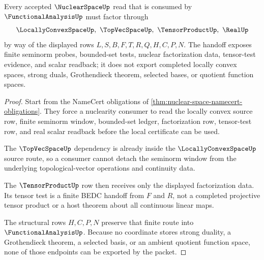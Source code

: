 \begin{theorem}
\label{thm:nuclear-space-finite-tensor-test-handoff}
Every accepted $\NuclearSpaceUp$ read that is consumed by $\FunctionalAnalysisUp$ must factor through
$$
\LocallyConvexSpaceUp,\ \TopVecSpaceUp,\ \TensorProductUp,\ \RealUp
$$
by way of the displayed rows $L,S,B,F,T,R,Q,H,C,P,N$. The handoff exposes finite seminorm probes, bounded-set tests, nuclear factorization data, tensor-test evidence, and scalar readback; it does not export completed locally convex spaces, strong duals, Grothendieck theorem, selected bases, or quotient function spaces.
\end{theorem}
\begin{proof}
Start from the NameCert obligations of \autoref{thm:nuclear-space-namecert-obligations}. They force a nuclearity consumer to read the locally convex source row, finite seminorm window, bounded-set ledger, factorization row, tensor-test row, and real scalar readback before the local certificate can be used.

The $\TopVecSpaceUp$ dependency is already inside the $\LocallyConvexSpaceUp$ source route, so a consumer cannot detach the seminorm window from the underlying topological-vector operations and continuity data.

The $\TensorProductUp$ row then receives only the displayed factorization data. Its tensor test is a finite BEDC handoff from $F$ and $R$, not a completed projective tensor product or a host theorem about all continuous linear maps.

The structural rows $H,C,P,N$ preserve that finite route into $\FunctionalAnalysisUp$. Because no coordinate stores strong duality, a Grothendieck theorem, a selected basis, or an ambient quotient function space, none of those endpoints can be exported by the packet.
\end{proof}



